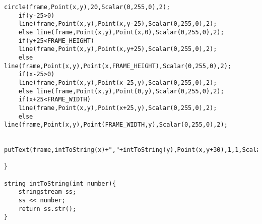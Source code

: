 \begin{lstlisting}[basicstyle=\tiny]
	circle(frame,Point(x,y),20,Scalar(0,255,0),2);
    if(y-25>0)
    line(frame,Point(x,y),Point(x,y-25),Scalar(0,255,0),2);
    else line(frame,Point(x,y),Point(x,0),Scalar(0,255,0),2);
    if(y+25<FRAME_HEIGHT)
    line(frame,Point(x,y),Point(x,y+25),Scalar(0,255,0),2);
    else line(frame,Point(x,y),Point(x,FRAME_HEIGHT),Scalar(0,255,0),2);
    if(x-25>0)
    line(frame,Point(x,y),Point(x-25,y),Scalar(0,255,0),2);
    else line(frame,Point(x,y),Point(0,y),Scalar(0,255,0),2);
    if(x+25<FRAME_WIDTH)
    line(frame,Point(x,y),Point(x+25,y),Scalar(0,255,0),2);
    else line(frame,Point(x,y),Point(FRAME_WIDTH,y),Scalar(0,255,0),2);

	putText(frame,intToString(x)+","+intToString(y),Point(x,y+30),1,1,Scalar(0,255,0),2);

}

string intToString(int number){
    stringstream ss;
	ss << number;
	return ss.str();
}
\end{lstlisting}